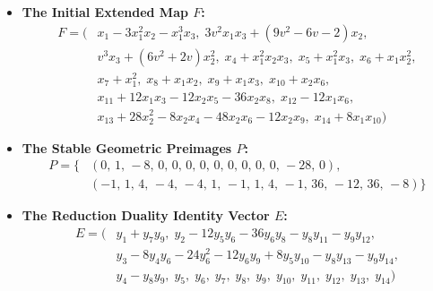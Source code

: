 \documentclass[11pt,a4paper]{article}
\begin{document}
\begin{itemize}
    \item \textbf{The Initial Extended Map $F$:}
    \begin{align*}
    F = \big( & x_1 - 3x_1^2x_2 - x_1^3x_3, \; 3v^2x_1x_3 + (9v^2-6v-2)x_2, \\ 
    & v^3x_3 + (6v^2+2v)x_2^2, \; x_4 + x_1^2x_2x_3, \; x_5 + x_1^2x_3, \; x_6 + x_1x_2^2, \\ 
    & x_7 + x_1^2, \; x_8 + x_1x_2, \; x_9 + x_1x_3, \; x_{10} + x_2x_6, \\
    & x_{11} + 12x_1x_3 - 12x_2x_5 - 36x_2x_8, \; x_{12} - 12x_1x_6, \\
    & x_{13} + 28x_2^2 - 8x_2x_4 - 48x_2x_6 - 12x_2x_9, \; x_{14} + 8x_1x_{10} \big)
    \end{align*}
    
    \item \textbf{The Stable Geometric Preimages $P$:}
    \begin{align*}
    P = \big\{ & (0, \, 1, \, -8, \, 0, \, 0, \, 0, \, 0, \, 0, \, 0, \, 0, \, 0, \, 0, \, -28, \, 0), \\
               & (-1, \, 1, \, 4, \, -4, \, -4, \, 1, \, -1, \, 1, \, 4, \, -1, \, 36, \, -12, \, 36, \, -8) \big\}
    \end{align*}
    
    \item \textbf{The Reduction Duality Identity Vector $E$:}
    \begin{align*}
    E = \big( & y_1 + y_7y_9, \; y_2 - 12y_5y_6 - 36y_6y_8 - y_8y_{11} - y_9y_{12}, \\
              & y_3 - 8y_4y_6 - 24y_6^2 - 12y_6y_9 + 8y_5y_{10} - y_8y_{13} - y_9y_{14}, \\
              & y_4 - y_8y_9, \; y_5, \; y_6, \; y_7, \; y_8, \; y_9, \; y_{10}, \; y_{11}, \; y_{12}, \; y_{13}, \; y_{14} \big)
    \end{align*}
    

\end{itemize}
\end{document}
